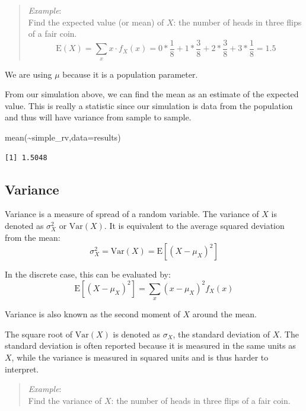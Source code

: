 \documentclass[
  letterpaper,
  DIV=11,
  numbers=noendperiod]{scrreprt}
\newenvironment{Shaded}{\begin{snugshade}}{\end{snugshade}}
\newcommand{\AttributeTok}[1]{\textcolor[rgb]{0.40,0.45,0.13}{#1}}
\newcommand{\FunctionTok}[1]{\textcolor[rgb]{0.28,0.35,0.67}{#1}}
\newcommand{\NormalTok}[1]{\textcolor[rgb]{0.00,0.23,0.31}{#1}}
\newcommand{\SpecialCharTok}[1]{\textcolor[rgb]{0.37,0.37,0.37}{#1}}
\begin{document}
\begin{quote}
\emph{Example}:\\
Find the expected value (or mean) of \(X\): the number of heads in three
flips of a fair coin. \[
\mbox{E}(X)=\sum_x x\cdot f_X(x) = 0*\frac{1}{8} + 1*\frac{3}{8} + 2*\frac{3}{8} + 3*\frac{1}{8}=1.5
\]
\end{quote}

We are using \(\mu\) because it is a population parameter.

From our simulation above, we can find the mean as an estimate of the
expected value. This is really a statistic since our simulation is data
from the population and thus will have variance from sample to sample.

\begin{Shaded}
\begin{Highlighting}[]
\FunctionTok{mean}\NormalTok{(}\SpecialCharTok{\textasciitilde{}}\NormalTok{simple\_rv,}\AttributeTok{data=}\NormalTok{results)}
\end{Highlighting}
\end{Shaded}

\begin{verbatim}
[1] 1.5048
\end{verbatim}

\subsection{Variance}\label{variance}

Variance is a measure of spread of a random variable. The variance of
\(X\) is denoted as \(\sigma^2_X\) or \(\mbox{Var}(X)\). It is
equivalent to the average squared deviation from the mean: \[
\sigma^2_X=\mbox{Var}(X)=\mbox{E}[(X-\mu_X)^2]
\]

In the discrete case, this can be evaluated by: \[
\mbox{E}[(X-\mu_X)^2]=\sum_x (x-\mu_X)^2f_X(x)
\]

Variance is also known as the second moment of \(X\) around the mean.

The square root of \(\mbox{Var}(X)\) is denoted as \(\sigma_X\), the
standard deviation of \(X\). The standard deviation is often reported
because it is measured in the same units as \(X\), while the variance is
measured in squared units and is thus harder to interpret.

\begin{quote}
\emph{Example}:\\
Find the variance of \(X\): the number of heads in three flips of a fair
coin.
\end{quote}
\end{document}
